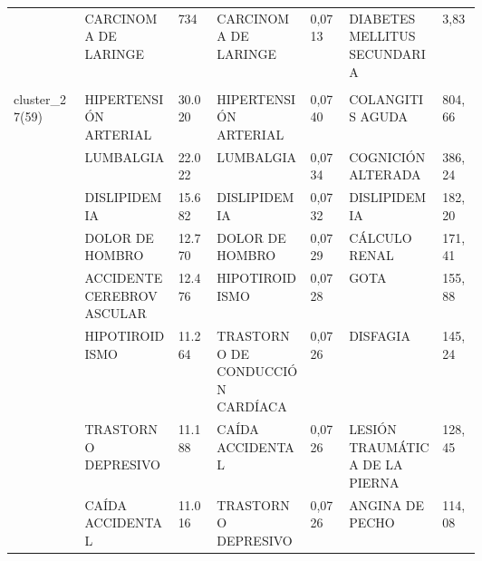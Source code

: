 \begin{landscape}
\begin{longtable}[c]{@{}lp{0.2\linewidth}lp{0.2\linewidth}lp{0.2\linewidth}l@{}}
                                  & CARCINOMA DE LARINGE                                          & 734    & CARCINOMA DE LARINGE                                   & 0,0713 & DIABETES MELLITUS SECUNDARIA                                  & 3,83     \\ \\
\multirow{10}{*}{cluster\_27(59)} & HIPERTENSIÓN ARTERIAL                                         & 30.020 & HIPERTENSIÓN ARTERIAL                                  & 0,0740 & COLANGITIS AGUDA                                              & 804,66   \\
                                  & LUMBALGIA                                                     & 22.022 & LUMBALGIA                                              & 0,0734 & COGNICIÓN ALTERADA                                            & 386,24   \\
                                  & DISLIPIDEMIA                                                  & 15.682 & DISLIPIDEMIA                                           & 0,0732 & DISLIPIDEMIA                                                  & 182,20   \\
                                  & DOLOR DE HOMBRO                                               & 12.770 & DOLOR DE HOMBRO                                        & 0,0729 & CÁLCULO RENAL                                                 & 171,41   \\
                                  & ACCIDENTE CEREBROVASCULAR                                     & 12.476 & HIPOTIROIDISMO                                         & 0,0728 & GOTA                                                          & 155,88   \\
                                  & HIPOTIROIDISMO                                                & 11.264 & TRASTORNO DE CONDUCCIÓN CARDÍACA                       & 0,0726 & DISFAGIA                                                      & 145,24   \\
                                  & TRASTORNO DEPRESIVO                                           & 11.188 & CAÍDA ACCIDENTAL                                       & 0,0726 & LESIÓN TRAUMÁTICA DE LA PIERNA                                & 128,45   \\
                                  & CAÍDA ACCIDENTAL                                              & 11.016 & TRASTORNO DEPRESIVO                                    & 0,0726 & ANGINA DE PECHO                                               & 114,08   \\

\end{longtable}
\end{landscape}
